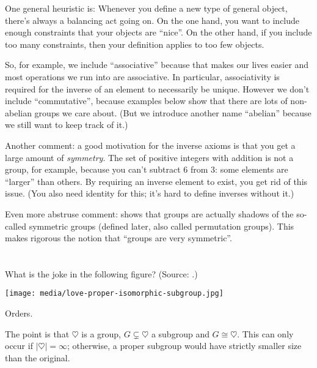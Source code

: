 One general heuristic is:
Whenever you define a new type of general object,
there's always a balancing act going on.
On the one hand, you want to include enough constraints that your
objects are ``nice''.
On the other hand, if you include too many constraints,
then your definition applies to too few objects.

So, for example, we include ``associative''
because that makes our lives easier
and most operations we run into are associative.
In particular, associativity is required for the inverse
of an element to necessarily be unique.
However we don't include ``commutative'', because examples below
show that there are lots of non-abelian groups we care about.
(But we introduce another name ``abelian''
because we still want to keep track of it.)

Another comment: a good motivation for the inverse axioms
is that you get a large amount of \emph{symmetry}.
The set of positive integers with addition is not a group,
for example, because you can't subtract $6$ from $3$:
some elements are ``larger'' than others.
By requiring an inverse element to exist, you get rid of this issue.
(You also need identity for this;
it's hard to define inverses without it.)

Even more abstruse comment:
 shows that groups are actually shadows of
the so-called symmetric groups (defined later, also called permutation groups).
This makes rigorous the notion that ``groups are very symmetric''.

\section{\problemhead}

\begin{problem}
	What is the joke in the following figure? (Source: \cite{img:snsd}.)
	\begin{center}
		\texttt{[image: media/love-proper-isomorphic-subgroup.jpg]}
	\end{center}
	\begin{hint}
		Orders.
	\end{hint}
	\begin{sol}
		The point is that $\heartsuit$ is a group, $G \subsetneq \heartsuit$ a subgroup and $G \cong \heartsuit$.
		This can only occur if $\left\lvert \heartsuit \right\rvert = \infty$;
		otherwise, a proper subgroup would have strictly smaller size than the original.
	\end{sol}
\end{problem}


